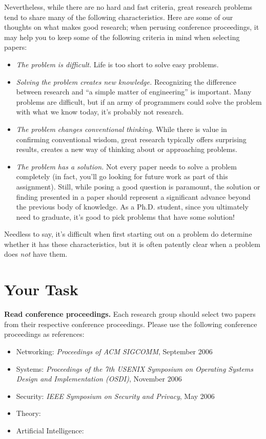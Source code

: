 \documentclass[11pt]{article}
\begin{document}
Nevertheless, while there are no hard and fast criteria, great research
problems tend to share many of the following characteristics.  Here are
some of our thoughts on what makes good research; when perusing
conference proceedings, it may help you to keep some of the following
criteria in mind when selecting papers:
\begin{itemize}
\item {\em The problem is difficult.}  Life is too short to solve easy
  problems. 
\item {\em Solving the problem creates new knowledge.} Recognizing the
  difference between research and ``a simple matter of engineering'' is
  important.  Many problems are difficult, but if an army of programmers
  could solve the problem with what we know today, it's probably not
  research.
\item {\em The problem changes conventional thinking.} While there is
  value in confirming conventional wisdom, great research typically
  offers surprising results, creates a new way of thinking about or
  approaching problems.
\item {\em The problem has a solution.} Not every paper needs to solve a
  problem completely (in fact, you'll go looking for future work as part
  of this assignment).  Still, while posing a good question is
  paramount, the solution or finding presented in a paper should
  represent a significant advance beyond the previous body of
  knowledge.  As a Ph.D. student, since you ultimately need to graduate,
  it's good to pick problems that have some solution!
\end{itemize}
\noindent
Needless to say, it's difficult when first starting out on a problem do
determine whether it has these characteristics, but it is often patently
clear when a problem does {\em not} have them.

\section{Your Task}

{\bf Read conference proceedings.}
Each research group should select two papers from their respective
conference proceedings.  Please use the following conference proceedings
as references:

\begin{itemize}
\itemsep=-1.5pt
\item Networking: {\em Proceedings of ACM SIGCOMM}, September 2006
\item Systems: {\em Proceedings of the 7th USENIX Symposium on Operating
  Systems Design and Implementation (OSDI)}, November 2006
\item Security: {\em IEEE Symposium on Security and Privacy}, May 2006
\item Theory:
\item Artificial Intelligence:
\end{itemize}
\end{document}
